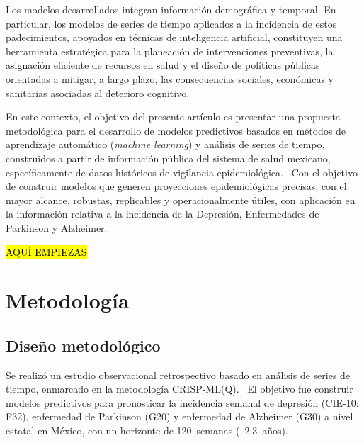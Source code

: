 \documentclass[12pt,a4paper]{article}
\begin{document}
Los modelos desarrollados integran información demográfica y temporal. En particular, los modelos de series de tiempo aplicados a la incidencia de estos padecimientos, apoyados en técnicas de inteligencia artificial, constituyen una herramienta estratégica para la planeación de intervenciones preventivas, la asignación eficiente de recursos en salud y el diseño de políticas públicas orientadas a mitigar, a largo plazo, las consecuencias sociales, económicas y sanitarias asociadas al deterioro cognitivo.

En este contexto, el objetivo del presente artículo es presentar una propuesta metodológica para el desarrollo de modelos predictivos basados en métodos de aprendizaje automático (\textit{machine learning}) y análisis de series de tiempo, construidos a partir de información pública del sistema de salud mexicano, específicamente de datos históricos de vigilancia epidemiológica.~\cite{sinave} Con el objetivo de construir modelos que generen proyecciones epidemiológicas precisas, con el mayor alcance, robustas, replicables y operacionalmente útiles, con aplicación en la información relativa a la incidencia de la Depresión, Enfermedades de Parkinson y Alzheimer.

\begin{center}
    \hl{AQUÍ EMPIEZAS}
\end{center}

\section*{Metodología}

\subsection*{Diseño metodológico}

Se realizó un estudio observacional retrospectivo basado en análisis de series de tiempo, enmarcado en la metodología CRISP-ML(Q).~\cite{studer2021} El objetivo fue construir modelos predictivos para pronosticar la incidencia semanal de depresión (CIE-10: F32), enfermedad de Parkinson (G20) y enfermedad de Alzheimer (G30) a nivel estatal en México, con un horizonte de 120~semanas (~2.3~años).
\end{document}
